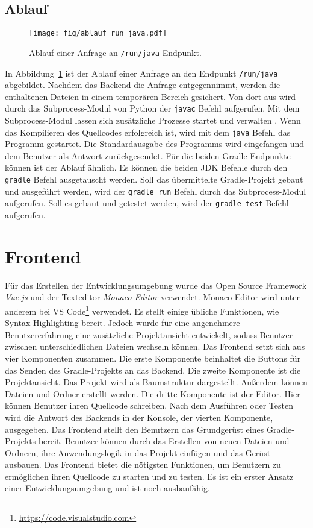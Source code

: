 \subsection{Ablauf}
\begin{figure}
  \centering
  \texttt{[image: fig/ablauf\_run\_java.pdf]}
  \caption{Ablauf einer Anfrage an \texttt{/run/java} Endpunkt.}
  \label{fig:ablauf_run_java}
\end{figure}

In Abbildung~\ref{fig:ablauf_run_java} ist der Ablauf einer Anfrage an den Endpunkt
\texttt{/run/java} abgebildet. Nachdem das Backend die Anfrage entgegennimmt,
werden die enthaltenen Dateien in einem temporären Bereich gesichert.
Von dort aus wird durch das Subprocess-Modul von Python der \texttt{javac} Befehl aufgerufen.
Mit dem Subprocess-Modul lassen sich zusätzliche Prozesse startet und verwalten \cite{PythonSubprocess}.
Wenn das Kompilieren des Quellcodes erfolgreich ist, wird mit dem \texttt{java} Befehl
das Programm gestartet. Die Standardausgabe des Programms wird eingefangen und
dem Benutzer als Antwort zurückgesendet. Für die beiden Gradle Endpunkte können
ist der Ablauf ähnlich. Es können die beiden JDK Befehle durch den \texttt{gradle}
Befehl ausgetauscht werden. Soll das übermittelte Gradle-Projekt gebaut und ausgeführt
werden, wird der \texttt{gradle run} Befehl durch das Subprocess-Modul aufgerufen.
Soll es gebaut und getestet werden, wird der \texttt{gradle test} Befehl aufgerufen.

\section{Frontend}
Für das Erstellen der Entwicklungsumgebung wurde das Open Source Framework \emph{Vue.js}
und der Texteditor \emph{Monaco Editor} verwendet. Monaco Editor wird unter anderem
bei VS Code\footnote{\url{https://code.visualstudio.com}} verwendet. Es stellt einige übliche Funktionen,
wie Syntax-Highlighting \cite{MonacoEditor} bereit.
Jedoch wurde für eine angenehmere Benutzererfahrung eine zusätzliche Projektansicht
entwickelt, sodass Benutzer zwischen unterschiedlichen Dateien wechseln können.
Das Frontend setzt sich aus vier Komponenten zusammen. Die erste Komponente beinhaltet
die Buttons für das Senden des Gradle-Projekts an das Backend. Die zweite Komponente
ist die Projektansicht. Das Projekt wird als Baumstruktur dargestellt. Außerdem können
Dateien und Ordner erstellt werden. Die dritte Komponente ist der Editor. Hier
können Benutzer ihren Quellcode schreiben. Nach dem Ausführen oder Testen wird die Antwort
des Backends in der Konsole, der vierten Komponente, ausgegeben.
Das Frontend stellt den Benutzern das Grundgerüst eines Gradle-Projekts bereit.
Benutzer können durch das Erstellen von neuen Dateien und Ordnern, ihre
Anwendungslogik in das Projekt einfügen und das Gerüst ausbauen. Das Frontend bietet
die nötigsten Funktionen, um Benutzern zu ermöglichen ihren Quellcode
zu starten und zu testen. Es ist ein erster Ansatz einer Entwicklungsumgebung
und ist noch ausbaufähig.

